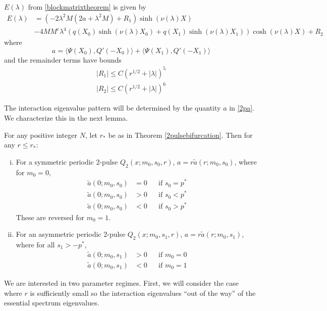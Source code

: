 \documentclass[thesis.tex]{subfiles}
\begin{document}
\begin{corollary}\label{2blockmatrix}
$E(\lambda)$ from \cref{blockmatrixtheorem} is given by
\begin{equation}\label{2detBeq}
\begin{aligned}
E(\lambda) &= \left(-2 \lambda^2 M (2a + \lambda^2 M) + R_1 \right) \sinh(\nu(\lambda)X) \\
&-4 M M^c \lambda^4 ( q(X_0) \sinh(\nu(\lambda)X_0) + q(X_1) \sinh(\nu(\lambda)X_1) ) \cosh(\nu(\lambda)X)  + R_2
\end{aligned}
\end{equation}
where
\begin{equation}\label{2pa}
a = \langle \Psi(X_0), Q'(-X_0) \rangle + \langle \Psi(X_1), Q'(-X_1) \rangle
\end{equation}
and the remainder terms have bounds
\begin{align*}
|R_1| \leq C(r^{1/2} + |\lambda|)^5 \\
|R_2| \leq C(r^{1/2} + |\lambda|)^6
\end{align*}
\end{corollary}

The interaction eigenvalue pattern will be determined by the quantity $a$ in \cref{2pa}. We characterize this in the next lemma.

\begin{lemma}\label{lemma:chara}
For any positive integer $N$, let $r_*$ be as in Theorem \ref{2pulsebifurcation}. Then for any $r \leq r_*$:
\begin{enumerate}[(i)]
	\item For a symmetric periodic 2-pulse $Q_2(x; m_0, s_0, r)$, $a = r \tilde{a}(r; m_0, s_0)$, where for $m_0 = 0$,
	\begin{equation}
	\begin{aligned}
	\tilde{a}(0; m_0, s_0) &= 0 && \text{if }s_0 = p^* \\
	\tilde{a}(0; m_0, s_0) &> 0 && \text{if }s_0 < p^* \\
	\tilde{a}(0; m_0, s_0) &< 0 && \text{if }s_0 > p^*
	\end{aligned}
	\end{equation}
	These are reversed for $m_0 = 1$.
	\item For an asymmetric periodic 2-pulse $Q_2(x; m_0, s_1, r)$, $a = r \tilde{a}(r; m_0, s_1)$, where for all $s_1 > -p^*$,
	\begin{equation}
	\begin{aligned}
	\tilde{a}(0; m_0, s_1) &> 0 && \text{if }m_0 = 0 \\
	\tilde{a}(0; m_0, s_1) &< 0 && \text{if }m_0 = 1
	\end{aligned}
	\end{equation}
\end{enumerate}
\end{lemma}

We are interested in two parameter regimes. First, we will consider the case where $r$ is sufficiently small so the interaction eigenvalues ``out of the way'' of the essential spectrum eigenvalues. 








\iffulldocument\else
	
	
\fi
\end{document}
